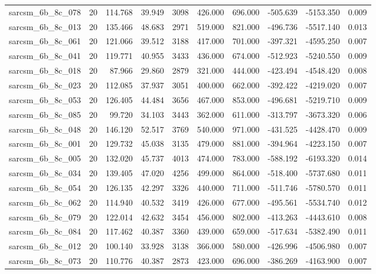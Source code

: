 \begin{tabular}{lrrrrrrrrr}
sarcsm\_6b\_8c\_078 & 20 & 114.768 & 39.949 & 3098 & 426.000 & 696.000 & -505.639 & -5153.350 & 0.009 \\
sarcsm\_6b\_8c\_013 & 20 & 135.466 & 48.683 & 2971 & 519.000 & 821.000 & -496.736 & -5517.140 & 0.013 \\
sarcsm\_6b\_8c\_061 & 20 & 121.066 & 39.512 & 3188 & 417.000 & 701.000 & -397.321 & -4595.250 & 0.007 \\
sarcsm\_6b\_8c\_041 & 20 & 119.771 & 40.955 & 3433 & 436.000 & 674.000 & -512.923 & -5240.550 & 0.009 \\
sarcsm\_6b\_8c\_018 & 20 & 87.966 & 29.860 & 2879 & 321.000 & 444.000 & -423.494 & -4548.420 & 0.008 \\
sarcsm\_6b\_8c\_023 & 20 & 112.085 & 37.937 & 3051 & 400.000 & 662.000 & -392.422 & -4219.020 & 0.007 \\
sarcsm\_6b\_8c\_053 & 20 & 126.405 & 44.484 & 3656 & 467.000 & 853.000 & -496.681 & -5219.710 & 0.009 \\
sarcsm\_6b\_8c\_085 & 20 & 99.720 & 34.103 & 3443 & 362.000 & 611.000 & -313.797 & -3673.320 & 0.006 \\
sarcsm\_6b\_8c\_048 & 20 & 146.120 & 52.517 & 3769 & 540.000 & 971.000 & -431.525 & -4428.470 & 0.009 \\
sarcsm\_6b\_8c\_001 & 20 & 129.732 & 45.038 & 3135 & 479.000 & 881.000 & -394.964 & -4223.150 & 0.007 \\
sarcsm\_6b\_8c\_005 & 20 & 132.020 & 45.737 & 4013 & 474.000 & 783.000 & -588.192 & -6193.320 & 0.014 \\
sarcsm\_6b\_8c\_034 & 20 & 139.405 & 47.020 & 4256 & 499.000 & 864.000 & -518.400 & -5737.680 & 0.011 \\
sarcsm\_6b\_8c\_054 & 20 & 126.135 & 42.297 & 3326 & 440.000 & 711.000 & -511.746 & -5780.570 & 0.011 \\
sarcsm\_6b\_8c\_062 & 20 & 114.940 & 40.532 & 3419 & 426.000 & 677.000 & -495.561 & -5534.740 & 0.012 \\
sarcsm\_6b\_8c\_079 & 20 & 122.014 & 42.632 & 3454 & 456.000 & 802.000 & -413.263 & -4443.610 & 0.008 \\
sarcsm\_6b\_8c\_084 & 20 & 117.462 & 40.387 & 3360 & 439.000 & 659.000 & -517.634 & -5382.490 & 0.011 \\
sarcsm\_6b\_8c\_012 & 20 & 100.140 & 33.928 & 3138 & 366.000 & 580.000 & -426.996 & -4506.980 & 0.007 \\
sarcsm\_6b\_8c\_073 & 20 & 110.776 & 40.387 & 2873 & 423.000 & 696.000 & -386.269 & -4163.900 & 0.007 \\

\end{tabular}

